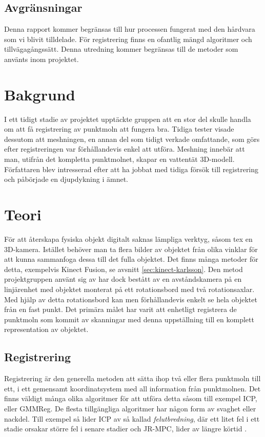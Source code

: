 \subsection{Avgränsningar}
\label{sec:limits-karlsson}
Denna rapport kommer begränsas till hur processen fungerat med den hårdvara som vi blivit tilldelade. För registrering finns en ofantlig mängd algoritmer och tillvägagångssätt. Denna utredning kommer begränsas till de metoder som använts inom projektet. 


\section{Bakgrund}
\label{sec:background-karlsson}
I ett tidigt stadie av projektet upptäckte gruppen att en stor del skulle handla om att få registrering av punktmoln att fungera bra. Tidiga tester visade dessutom att meshningen, en annan del som tidigt verkade omfattande, som görs efter registreringen var förhållandevis enkel att utföra. Meshning innebär att man, utifrån det kompletta punktmolnet, skapar en vattentät 3D-modell. Författaren blev intresserad efter att ha jobbat  med tidiga försök till registrering och påbörjade en djupdykning i ämnet.


\section{Teori}
\label{sec:theory-karlsson}

För att återskapa fysiska objekt digitalt saknas lämpliga verktyg, såsom tex en 3D-kamera. Istället behöver man ta flera bilder av objektet från olika vinklar för att kunna sammanfoga dessa till det fulla objektet. Det finns många metoder för detta, exempelvis Kinect Fusion, se avsnitt \ref{sec:kinect-karlsson}. Den metod projektgruppen använt sig av har dock bestått av en avståndskamera på en linjärenhet med objektet monterat på ett rotationsbord med två rotationsaxlar. Med hjälp av detta rotationsbord kan men förhållandevis enkelt se hela objektet från en fast punkt. Det primära målet har varit att enhetligt registrera de punktmoln som kommit av skanningar med denna uppställning till en komplett representation av objektet.


\subsection{Registrering}
\label{sec:registrering-karlsson}

Registrering är den generella metoden att sätta ihop två eller flera punktmoln till ett, i ett gemensamt koordinatsystem med all information från punktmolnen. Det finns väldigt många olika algoritmer för att utföra detta såsom till exempel ICP, eller GMMReg. De flesta tillgängliga algoritmer har någon form av svaghet eller nackdel. Till exempel så lider ICP av så kallad \textit{felutbredning}, där ett litet fel i ett stadie orsakar större fel i senare stadier och JR-MPC, lider av längre körtid \cite{Evangelidis-ECCV-2014}.


